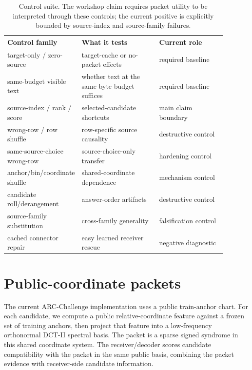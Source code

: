 \documentclass{article}
\newcommand{\arc}{ARC-Challenge}
\begin{document}
\begin{table}[t]
  \centering
  \scriptsize
  \setlength{\tabcolsep}{3pt}
  \begin{tabular}{p{0.22\linewidth}p{0.36\linewidth}p{0.31\linewidth}}
    \toprule
    Control family & What it tests & Current role \\
    \midrule
    target-only / zero-source & target-cache or no-packet effects & required baseline \\
    same-budget visible text & whether text at the same byte budget suffices & required baseline \\
    source-index / rank / score & selected-candidate shortcuts & main claim boundary \\
    wrong-row / row shuffle & row-specific source causality & destructive control \\
    same-source-choice wrong-row & source-choice-only transfer & hardening control \\
    anchor/bin/coordinate shuffle & shared-coordinate dependence & mechanism control \\
    candidate roll/derangement & answer-order artifacts & destructive control \\
    source-family substitution & cross-family generality & falsification control \\
    cached connector repair & easy learned receiver rescue & negative diagnostic \\
    \bottomrule
  \end{tabular}
  \caption{Control suite. The workshop claim requires packet utility to be interpreted through these controls; the current positive is explicitly bounded by source-index and source-family failures.}
  \label{tab:controls}
\end{table}

\section{Public-coordinate packets}

The current \arc{} implementation uses a public train-anchor chart. For each candidate, we compute a public relative-coordinate feature against a frozen set of training anchors, then project that feature into a low-frequency orthonormal DCT-II spectral basis. The packet is a sparse signed syndrome in this shared coordinate system. The receiver/decoder scores candidate compatibility with the packet in the same public basis, combining the packet evidence with receiver-side candidate information.
\end{document}
